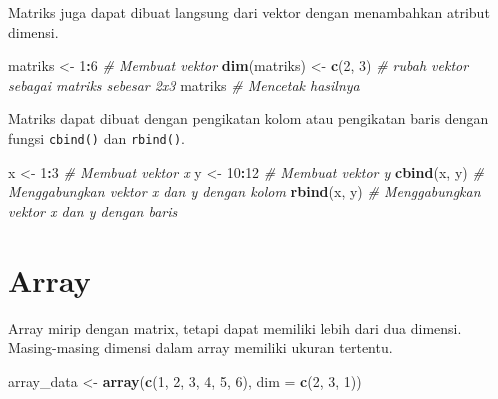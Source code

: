 \documentclass[
]{book}
\newenvironment{Shaded}{\begin{snugshade}}{\end{snugshade}}
\newcommand{\AttributeTok}[1]{\textcolor[rgb]{0.13,0.29,0.53}{#1}}
\newcommand{\CommentTok}[1]{\textcolor[rgb]{0.56,0.35,0.01}{\textit{#1}}}
\newcommand{\DecValTok}[1]{\textcolor[rgb]{0.00,0.00,0.81}{#1}}
\newcommand{\FunctionTok}[1]{\textcolor[rgb]{0.13,0.29,0.53}{\textbf{#1}}}
\newcommand{\NormalTok}[1]{#1}
\newcommand{\OtherTok}[1]{\textcolor[rgb]{0.56,0.35,0.01}{#1}}
\newcommand{\SpecialCharTok}[1]{\textcolor[rgb]{0.81,0.36,0.00}{\textbf{#1}}}
\begin{document}
Matriks juga dapat dibuat langsung dari vektor dengan menambahkan atribut dimensi.

\begin{Shaded}
\begin{Highlighting}[]
\NormalTok{matriks }\OtherTok{\textless{}{-}} \DecValTok{1}\SpecialCharTok{:}\DecValTok{6}                         \CommentTok{\# Membuat vektor}
\FunctionTok{dim}\NormalTok{(matriks) }\OtherTok{\textless{}{-}} \FunctionTok{c}\NormalTok{(}\DecValTok{2}\NormalTok{, }\DecValTok{3}\NormalTok{)                }\CommentTok{\# rubah vektor sebagai matriks sebesar 2x3}
\NormalTok{matriks                                }\CommentTok{\# Mencetak hasilnya}
\end{Highlighting}
\end{Shaded}

Matriks dapat dibuat dengan pengikatan kolom atau pengikatan baris dengan fungsi \texttt{cbind()} dan \texttt{rbind()}.

\begin{Shaded}
\begin{Highlighting}[]
\NormalTok{x }\OtherTok{\textless{}{-}} \DecValTok{1}\SpecialCharTok{:}\DecValTok{3}                              \CommentTok{\# Membuat vektor \textasciigrave{}x\textasciigrave{}}
\NormalTok{y }\OtherTok{\textless{}{-}} \DecValTok{10}\SpecialCharTok{:}\DecValTok{12}                            \CommentTok{\# Membuat vektor \textasciigrave{}y\textasciigrave{}}
\FunctionTok{cbind}\NormalTok{(x, y)                           }\CommentTok{\# Menggabungkan vektor \textasciigrave{}x\textasciigrave{} dan\textasciigrave{} y\textasciigrave{} dengan kolom}
\FunctionTok{rbind}\NormalTok{(x, y)                           }\CommentTok{\# Menggabungkan vektor \textasciigrave{}x\textasciigrave{} dan\textasciigrave{} y\textasciigrave{} dengan baris}
\end{Highlighting}
\end{Shaded}

\hypertarget{array}{%
\section{Array}\label{array}}

Array mirip dengan matrix, tetapi dapat memiliki lebih dari dua dimensi. Masing-masing dimensi dalam array memiliki ukuran tertentu.

\begin{Shaded}
\begin{Highlighting}[]
\NormalTok{array\_data }\OtherTok{\textless{}{-}} \FunctionTok{array}\NormalTok{(}\FunctionTok{c}\NormalTok{(}\DecValTok{1}\NormalTok{, }\DecValTok{2}\NormalTok{, }\DecValTok{3}\NormalTok{, }\DecValTok{4}\NormalTok{, }\DecValTok{5}\NormalTok{, }\DecValTok{6}\NormalTok{), }\AttributeTok{dim =} \FunctionTok{c}\NormalTok{(}\DecValTok{2}\NormalTok{, }\DecValTok{3}\NormalTok{, }\DecValTok{1}\NormalTok{))}
\end{Highlighting}
\end{Shaded}
\end{document}

